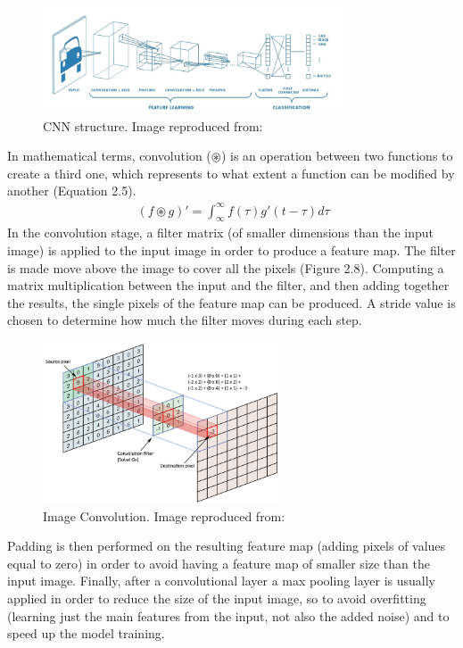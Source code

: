 \begin{figure}[ht!]%
    \centering
    \includegraphics[width=9cm]{images/cnn.PNG}%
    \caption{CNN structure. Image reproduced from: \cite{cnn}}%
\end{figure}

In mathematical terms, convolution ($\circledast$) is an operation between two functions to create a third one, which represents to what extent a function can be modified by another (Equation 2.5).
\begin{align}
\ (f \circledast g)' = \int_{\infty}^{\infty} f(\tau)g'(t-\tau)d\tau
\label{eq:3}
\end{align}
\useshortskip
In the convolution stage, a filter matrix (of smaller dimensions than the input image) is applied to the input image in order to produce a feature map. The filter is made move above the image to cover all the pixels (Figure 2.8). Computing a matrix multiplication between the input and the filter, and then adding together the results, the single pixels of the feature map can be produced. A stride value is chosen to determine how much the filter moves during each step.

\begin{figure}[ht!]%
    \centering
    \includegraphics[width=7cm]{images/conv.png}%
    \caption{Image Convolution. Image reproduced from: \cite{cnn}}%
\end{figure}

Padding is then performed on the resulting feature map (adding pixels of values equal to zero) in order to avoid having a feature map of smaller size than the input image. Finally, after a convolutional layer a max pooling layer is usually applied in order to reduce the size of the input image, so to avoid overfitting (learning just the main features from the input, not also the added noise) and to speed up the model training.

